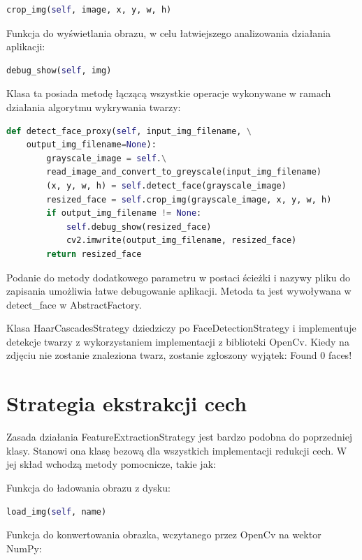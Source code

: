 \documentclass[oneside, eng]{mgr}
\begin{document}
\begin{lstlisting}[language=Python]
	crop_img(self, image, x, y, w, h)
\end{lstlisting}

Funkcja do wyświetlania obrazu, w celu łatwiejszego analizowania działania aplikacji:

\begin{lstlisting}[language=Python]
	debug_show(self, img)
\end{lstlisting}

Klasa ta posiada metodę łączącą wszystkie operacje wykonywane w ramach działania algorytmu wykrywania twarzy:

\begin{lstlisting}[language=Python]
    def detect_face_proxy(self, input_img_filename, \
    output_img_filename=None):
        grayscale_image = self.\
        read_image_and_convert_to_greyscale(input_img_filename)
        (x, y, w, h) = self.detect_face(grayscale_image)
        resized_face = self.crop_img(grayscale_image, x, y, w, h)
        if output_img_filename != None:
        	self.debug_show(resized_face)
            cv2.imwrite(output_img_filename, resized_face)
        return resized_face
\end{lstlisting}

Podanie do metody dodatkowego parametru w postaci ścieżki i nazywy pliku do zapisania umożliwia łatwe debugowanie aplikacji. Metoda ta jest wywoływana w detect\_face w AbstractFactory.

Klasa HaarCascadesStrategy dziedziczy po FaceDetectionStrategy i implementuje detekcje twarzy z wykorzystaniem implementacji z biblioteki OpenCv. Kiedy na zdjęciu nie zostanie znaleziona twarz, zostanie zgłoszony wyjątek: Found 0 faces!

\section{Strategia ekstrakcji cech}

Zasada działania FeatureExtractionStrategy jest bardzo podobna do poprzedniej klasy. Stanowi ona klasę bezową dla wszystkich implementacji redukcji cech. W jej skład wchodzą metody pomocnicze, takie jak:

Funkcja do ładowania obrazu z dysku:

\begin{lstlisting}[language=Python]
	load_img(self, name)
\end{lstlisting}

Funkcja do konwertowania obrazka, wczytanego przez OpenCv na wektor NumPy:
\end{document}
